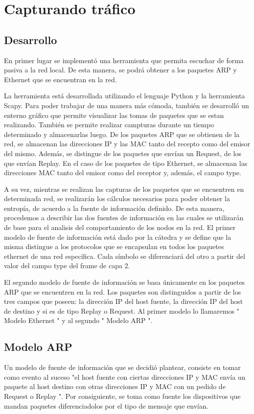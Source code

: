 \section{Capturando tráfico}

\subsection{Desarrollo}

En primer lugar se implementó una herramienta que permita escuchar de forma pasiva a la red local. De esta manera, se podrá obtener a los paquetes ARP y Ethernet que se encuentran en la red. 

La herramienta está desarrollada utilizando el lenguaje Python y la herramienta Scapy. Para poder trabajar de una manera más cómoda, también se desarrolló un enterno gráfico que permite visualizar las tomas de paquetes que se estan realizando. También se permite realizar campturas durante un tiempo determinado y almacenarlas luego.  
De los paquetes ARP que se obtienen de la red, se almacenan las direcciones IP y las MAC tanto del recepto como del emisor del mismo. Además, se distingue de los paquetes que envían un Request, de los que envían Replay. En el caso de los paquetes de tipo Ethernet, se almacenan las direcciones MAC tanto del emisor como del receptor y, además, el campo type.

A su vez, mientras se realizan las capturas de los paquetes que se encuentren en determinada red, se realizarán los cálculos necesarios para poder obtener la entropía, de acuerdo a la fuente de información definido. De esta manera, procedemos a describir las dos fuentes de información en las cuales se utilizarán de base para el analisis del comportamiento de los nodos en la red. 
El primer modelo de fuente de información está dado por la cátedra y se define que la misma distingue a los protocolos que se encapsulan en todos los paquetes ethernet de una red específica. Cada símbolo se diferenciará del otro a partir del valor del campo type del frame de capa 2.

El segundo modelo de fuente de información se basa únicamente en los paquetes ARP que se encuentren en la red. Los paquetes son distinguidos a partir de los tres campos que poseen: la dirección IP del host fuente, la dirección IP del host de destino y si es de tipo Replay o Request. 
Al primer modelo lo llamaremos " Modelo Ethernet " y al segundo " Modelo ARP ".


\subsection{Modelo ARP}
Un modelo de fuente de información que se decidió plantear, consiste en tomar como evento al suceso "el host fuente con ciertas direcciones IP y MAC envía un paquete al host destino con otras direcciones IP y MAC con un pedido de Request o Replay ". Por consiguiente, se toma como fuente los dispositivos que mandan paquetes diferenciadolos por el tipo de mensaje que envían.


